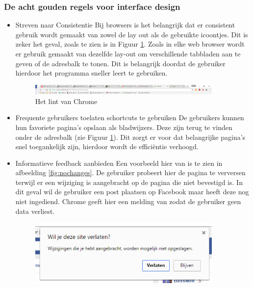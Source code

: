 \documentclass[12pt]{article}
\begin{document}
\subsubsection{De acht gouden regels voor interface design}
\begin{itemize}
\item Streven naar Consistentie
\newline
Bij browsers is het belangrijk dat er consistent gebruik wordt gemaakt van zowel de lay out als de gebruikte icoontjes. Dit is zeker het geval, zoals te zien is in Figuur \ref{fig:tabsChrome}. Zoals in elke web browser wordt er gebruik gemaakt van dezelfde lay-out om verschillende tabbladen aan te geven of de adresbalk te tonen. Dit is belangrijk doordat de gebruiker hierdoor het programma sneller leert te gebruiken.
\begin{figure}
  \centering
    \includegraphics[width=0.9\textwidth]{Tabs_Chrome.png}
  \caption{Het lint van Chrome}
  \label{fig:tabsChrome}
\end{figure}
\item Frequente gebruikers toelaten schortcuts te gebruiken
\newline
De gebruikers kunnen hun favoriete pagina's opslaan als bladwijzers. Deze zijn terug te vinden onder de adresbalk (zie Figuur \ref{fig:tabsChrome}). Dit zorgt er voor dat belangrijke pagina's snel toegankelijk zijn, hierdoor wordt de efficiëntie verhoogd.
\item Informatieve feedback aanbieden
\newline
Een voorbeeld hier van is te zien in afbeelding \ref{fig:nochanges}. De gebruiker probeert hier de pagina te verversen terwijl er een wijziging is aangebracht op de pagina die niet bevestigd is. In dit geval wil de gebruiker een post plaatsen op Facebook maar heeft deze nog niet ingediend. Chrome geeft hier een melding van zodat de gebruiker geen data verliest.
\begin{figure}
  \centering
    \includegraphics[width=0.9\textwidth]{No_Changes.png}

\end{figure}
\end{itemize}
\end{document}
